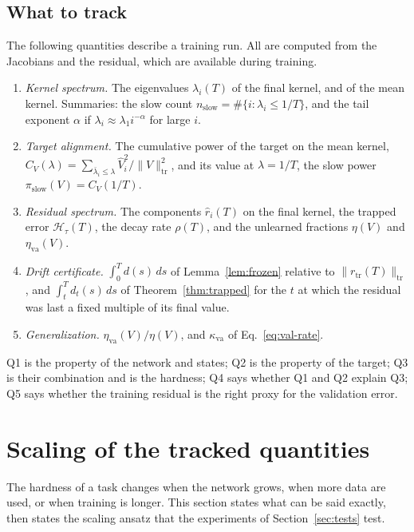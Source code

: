 \documentclass[11pt]{article}
\theoremstyle{definition}
\theoremstyle{remark}
\newcommand{\Hard}{\mathcal{H}}
\newcommand{\tr}{\mathrm{tr}}
\newcommand{\va}{\mathrm{va}}
\newcommand{\slow}{\mathrm{slow}}
\begin{document}
\subsection{What to track}\label{sec:track}

The following quantities describe a training run.
All are computed from the Jacobians and the residual, which are available during training.
\begin{enumerate}[label=Q\arabic*.]
\item \emph{Kernel spectrum.} The eigenvalues $\lambda_i(T)$ of the final kernel, and of the mean kernel.
Summaries: the slow count $n_\slow = \#\{i : \lambda_i \le 1/T\}$, and the tail exponent $\alpha$ if $\lambda_i \approx \lambda_1 i^{-\alpha}$ for large $i$.
\item \emph{Target alignment.} The cumulative power of the target on the mean kernel, $C_V(\lambda) = \sum_{\bar\lambda_i \le \lambda}\hat V_i^2/\|V\|_\tr^2$, and its value at $\lambda = 1/T$, the slow power $\pi_\slow(V) = C_V(1/T)$.
\item \emph{Residual spectrum.} The components $\hat r_i(T)$ on the final kernel, the trapped error $\Hard_\tau(T)$, the decay rate $\rho(T)$, and the unlearned fractions $\eta(V)$ and $\eta_\va(V)$.
\item \emph{Drift certificate.} $\int_0^T d(s)\,ds$ of Lemma~\ref{lem:frozen} relative to $\|r_\tr(T)\|_\tr$, and $\int_t^{T} d_t(s)\,ds$ of Theorem~\ref{thm:trapped} for the $t$ at which the residual was last a fixed multiple of its final value.
\item \emph{Generalization.} $\eta_\va(V)/\eta(V)$, and $\kappa_\va$ of Eq.~\eqref{eq:val-rate}.
\end{enumerate}
Q1 is the property of the network and states; Q2 is the property of the target; Q3 is their combination and is the hardness; Q4 says whether Q1 and Q2 explain Q3; Q5 says whether the training residual is the right proxy for the validation error.

\section{Scaling of the tracked quantities}\label{sec:scaling}

The hardness of a task changes when the network grows, when more data are used, or when training is longer.
This section states what can be said exactly, then states the scaling ansatz that the experiments of Section~\ref{sec:tests} test.
\end{document}
